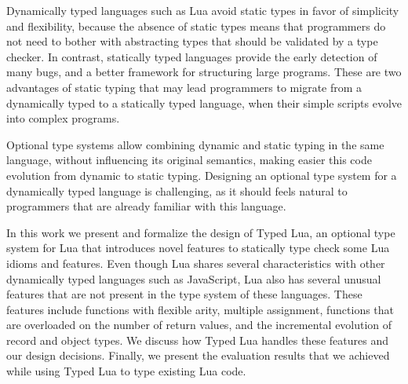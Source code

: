 Dynamically typed languages such as Lua avoid static types in favor of
simplicity and flexibility, because the absence of static types means
that programmers do not need to bother with abstracting types that
should be validated by a type checker.
In contrast, statically typed languages provide the early detection of
many bugs, and a better framework for structuring large programs.
These are two advantages of static typing that may lead programmers
to migrate from a dynamically typed to a statically typed language,
when their simple scripts evolve into complex programs.

Optional type systems allow combining dynamic and static typing in
the same language, without influencing its original semantics,
making easier this code evolution from dynamic to static typing.
Designing an optional type system for a dynamically typed language
is challenging, as it should feels natural to programmers that are
already familiar with this language.

In this work we present and formalize the design of Typed Lua,
an optional type system for Lua that introduces novel features
to statically type check some Lua idioms and features.
Even though Lua shares several characteristics with other dynamically
typed languages such as JavaScript, Lua also has several unusual features
that are not present in the type system of these languages.
These features include functions with flexible arity, multiple assignment,
functions that are overloaded on the number of return values, and the
incremental evolution of record and object types.
We discuss how Typed Lua handles these features and our design decisions.
Finally, we present the evaluation results that we achieved while using
Typed Lua to type existing Lua code.
